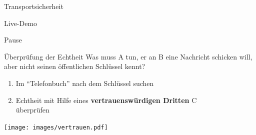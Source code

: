   \begin{frame}{Transportsicherheit}
    \begin{centering}
      \Huge Live-Demo
    \end{centering}
  \end{frame}
  
  \begin{frame}
    \begin{centering}
      \Huge Pause
    \end{centering}
  \end{frame}


  \begin{frame}{Überprüfung der Echtheit}
  Was muss A tun, er an B eine Nachricht schicken will, aber nicht seinen öffentlichen Schlüssel kennt?\\
  \begin{enumerate}
    \item Im ``Telefonbuch'' nach dem Schlüssel suchen
    \item Echtheit mit Hilfe eines \textbf{vertrauenswürdigen Dritten} C\\überprüfen
  \end{enumerate}
  \begin{center}
    \texttt{[image: images/vertrauen.pdf]}
  \end{center}
  \end{frame}

